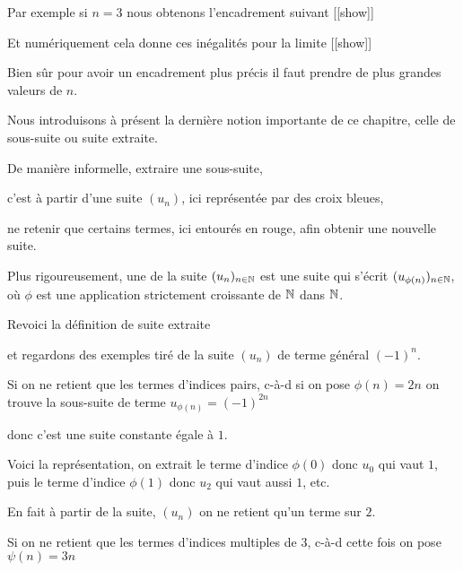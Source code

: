 \change

Par exemple si $n=3$
nous obtenons l'encadrement suivant [[show]]


\change

Et numériquement cela donne ces inégalités pour la limite  [[show]]

Bien sûr pour avoir un encadrement plus précis il 
faut prendre de plus grandes valeurs de $n$.
 
 
 
 \diapo

 Nous introduisons à présent la dernière notion importante de ce chapitre, 
 celle de sous-suite ou suite extraite.

 
 De manière informelle, extraire une sous-suite, 
 
 c'est à partir d'une suite $(u_n)$, ici représentée par des croix bleues,
 
ne retenir que certains termes, ici entourés en rouge, afin 
 obtenir une nouvelle suite.


 Plus rigoureusement, une  de la suite
 $(u_n)_{n\in \mathbb{N}}$ est une suite qui s'écrit 
$(u_{\phi(n)})_{n\in \mathbb{N}}$, où $\phi$ est une 
application strictement croissante de $\mathbb{N}$ dans $\mathbb{N}$.

 
 \diapo
 
Revoici la définition de suite extraite 

\change

et regardons des exemples tiré de la suite $(u_n)$ 
de terme général $(-1)^n$. 

\change

Si on ne retient que les termes d'indices pairs, c-à-d si on pose
$\phi(n)=2n$ on trouve la sous-suite de terme $u_{\phi(n)} = (-1) ^{2n}$ 

\change

donc c'est une suite
constante égale à $1$.

\change

Voici la représentation, on extrait le terme d'indice $\phi(0)$ donc $u_0$ qui vaut $1$,
puis le terme d'indice $\phi(1)$ donc $u_2$ qui vaut aussi $1$, etc.

En fait à partir de la suite, $(u_n)$ on ne retient qu'un terme sur $2$.

\change

Si on ne retient que les termes d'indices multiples de $3$, 
c-à-d cette fois on pose $\psi(n)=3n$

